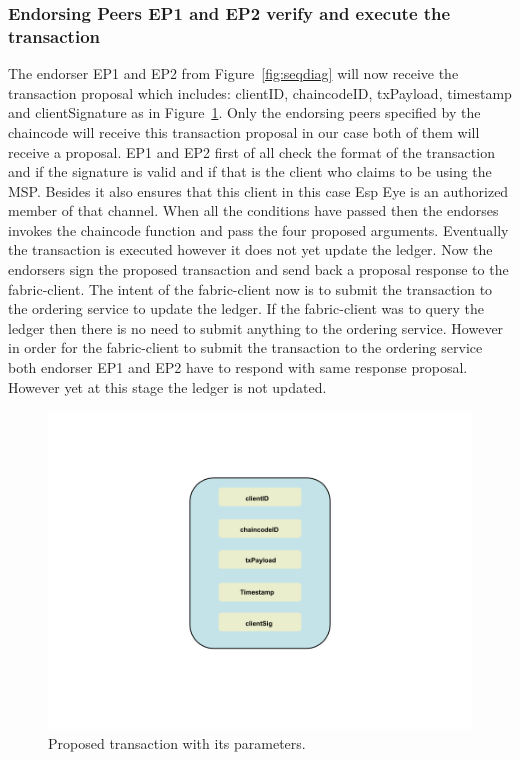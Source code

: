 \subsubsection{Endorsing Peers EP1 and EP2 verify and execute the transaction}

The endorser EP1 and EP2 from Figure~\ref{fig:seqdiag} will now receive the transaction proposal which includes: clientID, chaincodeID, txPayload, timestamp and clientSignature as in Figure~\ref{fig:endorsejson}. Only the endorsing peers specified by the chaincode will receive this transaction proposal in our case both of them will receive a proposal. EP1 and EP2 first of all check the format of the transaction and if the signature is valid and if that is the client who claims to be using the MSP. Besides it also ensures that this client in this case Esp Eye is an authorized member of that channel. When all the conditions have passed then the endorses invokes the chaincode function and pass the four proposed arguments. Eventually the transaction is executed however it does not yet update the ledger. Now the endorsers sign the proposed transaction and send back a proposal response to the fabric-client. The intent of the fabric-client now is to submit the transaction to the ordering service to update the ledger. If the fabric-client was to query the ledger then there is no need to submit anything to the ordering service. However in order for the fabric-client to submit the transaction to the ordering service both endorser EP1 and EP2 have to respond with same response proposal. However yet at this stage the ledger is not updated. 

\begin{figure}[!htb]
    \centering
    \includegraphics[width=1\textwidth]{figures/endorsejson.png}
    \caption{Proposed transaction with its parameters.}
    \label{fig:endorsejson}
\end{figure}



